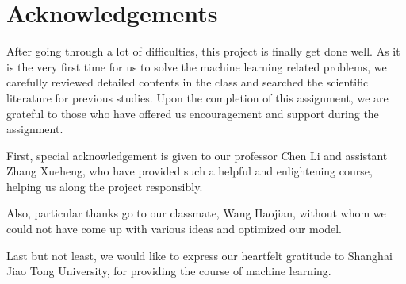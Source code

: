\section*{Acknowledgements}
After going through a lot of difficulties, this project is finally get done well. As it is the very first time for us to solve the machine learning related problems, we carefully reviewed detailed contents in the class and searched the scientific literature for  previous studies. Upon the completion of this assignment, we are grateful to those who have offered us encouragement and support during the assignment.


First, special acknowledgement is given to our professor Chen Li and assistant Zhang Xueheng, who have provided such a helpful and enlightening course, helping us along the project responsibly.


Also, particular thanks go to our classmate, Wang Haojian, without whom we could not have come up with various ideas and optimized our model.


Last but not least, we would like to express our heartfelt gratitude to Shanghai Jiao Tong University, for providing the course of machine learning.
